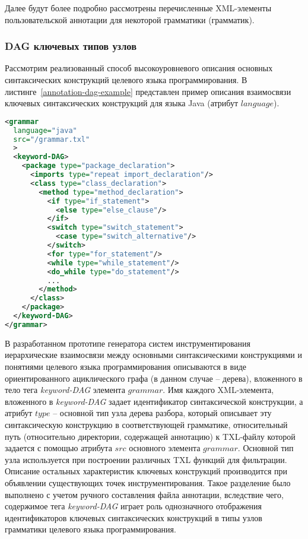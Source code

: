 
Далее будут более подробно рассмотрены перечисленные XML-элементы пользовательской аннотации для некоторой грамматики (грамматик).

\subsubsection{DAG ключевых типов узлов}

Рассмотрим реализованный способ высокоуровневого описания основных синтаксических конструкций целевого языка программирования.
В листинге~\ref{annotation-dag-example} представлен пример описания взаимосвязи ключевых синтаксических конструкций для языка Java (атрибут $language$).

\begin{lstlisting}[frame=single, language=XML, label={annotation-dag-example}, caption={Пример DAG для грамматики языка Java.}]
<grammar
  language="java"
  src="/grammar.txl"
  >
  <keyword-DAG>
    <package type="package_declaration">
      <imports type="repeat import_declaration"/>
      <class type="class_declaration">
        <method type="method_declaration">
          <if type="if_statement">
            <else type="else_clause"/>
          </if>
          <switch type="switch_statement">
            <case type="switch_alternative"/>
          </switch>
          <for type="for_statement"/>
          <while type="while_statement"/>
          <do_while type="do_statement"/>
          ...
        </method>
      </class>
    </package>
  </keyword-DAG>
</grammar>
\end{lstlisting}

В разработанном прототипе генератора систем инструментирования иерархические взаимосвязи между основными синтаксическими конструкциями и понятиями целевого языка программирования описываются в виде ориентированного ациклического графа (в данном случае -- дерева), вложенного в тело тега \textit{keyword-DAG} элемента $grammar$.
Имя каждого XML-элемента, вложенного в \textit{keyword-DAG} задает идентификатор синтаксической конструкции, а атрибут $type$ -- основной тип узла дерева разбора, который описывает эту синтаксическую конструкцию в соответствующей грамматике, относительный путь (относительно директории, содержащей аннотацию) к TXL-файлу которой задается с помощью атрибута $src$ основного элемента $grammar$.
Основной тип узла используется при построении различных TXL функций для фильтрации.
Описание остальных характеристик ключевых конструкций производится при объявлении существующих точек инструментирования.
Такое разделение было выполнено с учетом ручного составления файла аннотации, вследствие чего, содержимое тега \textit{keyword-DAG} играет роль однозначного отображения идентификаторов ключевых синтаксических конструкций в типы узлов грамматики целевого языка программирования.

